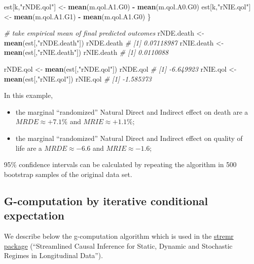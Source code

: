 \documentclass[
]{book}
\newenvironment{Shaded}{\begin{snugshade}}{\end{snugshade}}
\newcommand{\CommentTok}[1]{\textcolor[rgb]{0.56,0.35,0.01}{\textit{#1}}}
\newcommand{\FunctionTok}[1]{\textcolor[rgb]{0.13,0.29,0.53}{\textbf{#1}}}
\newcommand{\NormalTok}[1]{#1}
\newcommand{\OtherTok}[1]{\textcolor[rgb]{0.56,0.35,0.01}{#1}}
\newcommand{\SpecialCharTok}[1]{\textcolor[rgb]{0.81,0.36,0.00}{\textbf{#1}}}
\newcommand{\StringTok}[1]{\textcolor[rgb]{0.31,0.60,0.02}{#1}}
\providecommand{\tightlist}{%
  \setlength{\itemsep}{0pt}\setlength{\parskip}{0pt}}
\begin{document}
\begin{Shaded}
\begin{Highlighting}[]
\NormalTok{  est[k,}\StringTok{"rNDE.qol"}\NormalTok{] }\OtherTok{\textless{}{-}} \FunctionTok{mean}\NormalTok{(m.qol.A1.G0) }\SpecialCharTok{{-}} \FunctionTok{mean}\NormalTok{(m.qol.A0.G0)}
\NormalTok{  est[k,}\StringTok{"rNIE.qol"}\NormalTok{] }\OtherTok{\textless{}{-}} \FunctionTok{mean}\NormalTok{(m.qol.A1.G1) }\SpecialCharTok{{-}} \FunctionTok{mean}\NormalTok{(m.qol.A1.G0)}
\NormalTok{\}}

\CommentTok{\# take empirical mean of final predicted outcomes}
\NormalTok{rNDE.death }\OtherTok{\textless{}{-}} \FunctionTok{mean}\NormalTok{(est[,}\StringTok{"rNDE.death"}\NormalTok{])}
\NormalTok{rNDE.death}
\CommentTok{\# [1] 0.07118987}
\NormalTok{rNIE.death }\OtherTok{\textless{}{-}} \FunctionTok{mean}\NormalTok{(est[,}\StringTok{"rNIE.death"}\NormalTok{])}
\NormalTok{rNIE.death}
\CommentTok{\# [1] 0.0110088}

\NormalTok{rNDE.qol }\OtherTok{\textless{}{-}} \FunctionTok{mean}\NormalTok{(est[,}\StringTok{"rNDE.qol"}\NormalTok{])}
\NormalTok{rNDE.qol}
\CommentTok{\# [1] {-}6.649923}
\NormalTok{rNIE.qol }\OtherTok{\textless{}{-}}  \FunctionTok{mean}\NormalTok{(est[,}\StringTok{"rNIE.qol"}\NormalTok{])}
\NormalTok{rNIE.qol}
\CommentTok{\# [1] {-}1.585373}
\end{Highlighting}
\end{Shaded}

In this example,

\begin{itemize}
\tightlist
\item
  the marginal ``randomized'' Natural Direct and Indirect effect on death are a \(MRDE \approx +7.1\%\) and \(MRIE \approx +1.1\%\);
\item
  the marginal ``randomized'' Natural Direct and Indirect effect on quality of life are a \(MRDE \approx -6.6\) and \(MRIE \approx -1.6\);
\end{itemize}

95\% confidence intervals can be calculated by repeating the algorithm in 500 bootstrap samples of the original data set.

\subsection{G-computation by iterative conditional expectation}\label{g-computation-by-iterative-conditional-expectation}

We describe below the g-computation algorithm which is used in the \href{https://github.com/romainkp/stremr}{stremr package} (``Streamlined Causal Inference for Static, Dynamic and Stochastic Regimes in Longitudinal Data'').
\end{document}
